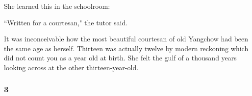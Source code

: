 \par She learned this in the schoolroom:
\par ``Written for a courtesan," the tutor said.
\par It was inconceivable how the most beautiful courtesan of old Yangchow had been the same age as herself. Thirteen was actually twelve by modern reckoning which did not count you as a year old at birth. She felt the gulf of a thousand years looking across at the other thirteen-year-old.




\subsubsection*{3}


